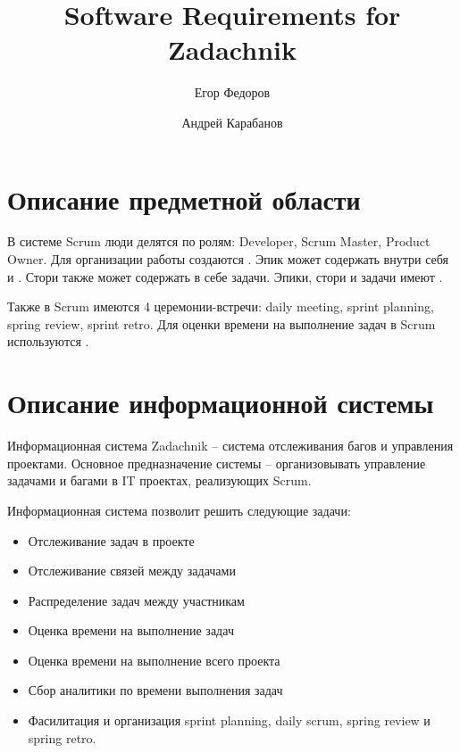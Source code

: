 \documentclass{article}
\author{Егор Федоров \and Андрей Карабанов}
\title{Software Requirements for Zadachnik}
\begin{document}
\maketitle
\tableofcontents

\section{Описание предметной области}
В системе Scrum люди делятся по ролям:
Developer, Scrum Master, Product Owner.
Для организации работы создаются .
Эпик может содержать внутри себя  и
. Стори также может содержать в себе задачи.
Эпики, стори и задачи имеют .

Также в Scrum имеются 4 церемонии-встречи: daily meeting, sprint
planning, spring review, sprint retro.
Для оценки времени на выполнение задач в Scrum используются .


\section{Описание информационной системы}
Информационная система Zadachnik -- система отслеживания багов и
управления проектами.
Основное предназначение системы -- организовывать управление задачами и багами
в IT проектах, реализующих Scrum.

Информационная система позволит решить следующие задачи:
\begin{itemize}
  \item Отслеживание задач в проекте
  \item Отслеживание связей между задачами
  \item Распределение задач между участникам
  \item Оценка времени на выполнение задач
  \item Оценка времени на выполнение всего проекта
  \item Сбор аналитики по времени выполнения задач
  \item Фасилитация и организация sprint planning, daily scrum, spring review и spring retro.
\end{itemize}
\end{document}
